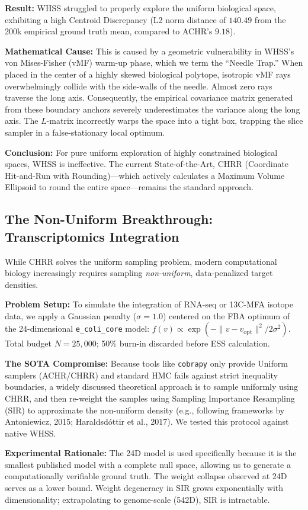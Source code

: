 \documentclass[12pt]{article}
\begin{document}
\textbf{Result:} WHSS struggled to properly explore the uniform biological space, exhibiting a high Centroid Discrepancy (L2 norm distance of $140.49$ from the 200k empirical ground truth mean, compared to ACHR's $9.18$). 

\textbf{Mathematical Cause:} This is caused by a geometric vulnerability in WHSS's von Mises-Fisher (vMF) warm-up phase, which we term the ``Needle Trap.'' When placed in the center of a highly skewed biological polytope, isotropic vMF rays overwhelmingly collide with the side-walls of the needle. Almost zero rays traverse the long axis. Consequently, the empirical covariance matrix generated from these boundary anchors severely underestimates the variance along the long axis. The $L$-matrix incorrectly warps the space into a tight box, trapping the slice sampler in a false-stationary local optimum.

\textbf{Conclusion:} For pure uniform exploration of highly constrained biological spaces, WHSS is ineffective. The current State-of-the-Art, CHRR (Coordinate Hit-and-Run with Rounding)---which actively calculates a Maximum Volume Ellipsoid to round the entire space---remains the standard approach.

\subsection{The Non-Uniform Breakthrough: Transcriptomics Integration}
While CHRR solves the uniform sampling problem, modern computational biology increasingly requires sampling \emph{non-uniform}, data-penalized target densities. 

\textbf{Problem Setup:} To simulate the integration of RNA-seq or 13C-MFA isotope data, we apply a Gaussian penalty ($\sigma=1.0$) centered on the FBA optimum of the 24-dimensional \texttt{e\_coli\_core} model: $f(v) \propto \exp(-\|v - v_{\text{opt}}\|^2 / 2\sigma^2)$. Total budget $N=25{,}000$; 50\% burn-in discarded before ESS calculation.

\textbf{The SOTA Compromise:} Because tools like \texttt{cobrapy} only provide Uniform samplers (ACHR/CHRR) and standard HMC fails against strict inequality boundaries, a widely discussed theoretical approach is to sample uniformly using CHRR, and then re-weight the samples using Sampling Importance Resampling (SIR) to approximate the non-uniform density (e.g., following frameworks by Antoniewicz, 2015; Haraldsd\'ottir et al., 2017). We tested this protocol against native WHSS.

\textbf{Experimental Rationale:} The 24D model is used specifically because it is the smallest published model with a complete null space, allowing us to generate a computationally verifiable ground truth. The weight collapse observed at 24D serves as a lower bound. Weight degeneracy in SIR grows exponentially with dimensionality; extrapolating to genome-scale (542D), SIR is intractable.
\end{document}
